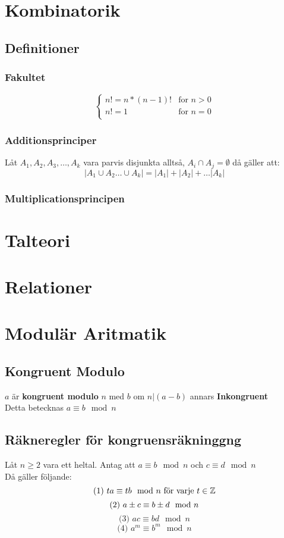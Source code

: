 \documentclass{article}
\begin{document}
	\section{Kombinatorik}
	\subsection{Definitioner}
	\subsubsection{Fakultet}
	$$
	\begin{cases}
		n! = n * (n - 1)! & \text{for }n > 0\\    
		n! = 1 & \text{for } n = 0\\
	\end{cases}
	$$
	\subsubsection{Additionsprinciper}
	Låt $A_1, A_2, A_3, \dots ,A_k$ vara parvis disjunkta alltså, $A_i \cap A_j = \emptyset$ då gäller att:
	$$
		|A_1 \cup A_2 \dots \cup A_k| = |A_1| + |A_2| + \dots |A_k|
	$$
	\subsubsection{Multiplicationsprincipen}


	\section{Talteori}

	\section{Relationer}

	\section{Modulär Aritmatik}
	
	\subsection{Kongruent Modulo}
	$a$ är \textbf{kongruent modulo} $n$ med $b$ om $n | (a-b)$ annars \textbf{Inkongruent} \\
	Detta betecknas	$a \equiv b \mod n$

	\subsection{Räkneregler för kongruensräkninggng}
	Låt $n \geq 2$ vara ett heltal. Antag att $a \equiv b \mod n$ och $c \equiv d \mod n$\\
	Då gäller följande:\\
	$$
	\text{(1) } ta \equiv tb \mod n \text{ för varje } t \in \mathbb{Z} \\
	$$$$
	\text{(2) } a \pm c \equiv b \pm d \mod n \\
	$$$$
	\text{(3) } ac \equiv bd \mod n
	$$$$
	\text{(4) } a^{m} \equiv b^{m} \mod n
	$$
\end{document}
